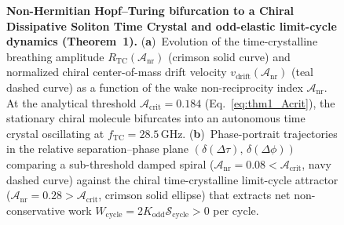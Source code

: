 \documentclass[11pt,letterpaper]{article}
\begin{document}
\begin{figure}[t!]
\centering
\resizebox{0.98\textwidth}{!}{}
\caption{\textbf{Non-Hermitian Hopf--Turing bifurcation to a Chiral Dissipative Soliton Time Crystal and odd-elastic limit-cycle dynamics (Theorem~1).} (\textbf{a})~Evolution of the time-crystalline breathing amplitude $R_{\mathrm{TC}}(\mathcal{A}_{\mathrm{nr}})$ (crimson solid curve) and normalized chiral center-of-mass drift velocity $v_{\mathrm{drift}}(\mathcal{A}_{\mathrm{nr}})$ (teal dashed curve) as a function of the wake non-reciprocity index $\mathcal{A}_{\mathrm{nr}}$. At the analytical threshold $\mathcal{A}_{\mathrm{crit}} = 0.184$ (Eq.~\eqref{eq:thm1_Acrit}), the stationary chiral molecule bifurcates into an autonomous time crystal oscillating at $f_{\mathrm{TC}} = 28.5\,\mathrm{GHz}$. (\textbf{b})~Phase-portrait trajectories in the relative separation--phase plane $(\delta(\Delta\tau),\,\delta(\Delta\phi))$ comparing a sub-threshold damped spiral ($\mathcal{A}_{\mathrm{nr}} = 0.08 < \mathcal{A}_{\mathrm{crit}}$, navy dashed curve) against the chiral time-crystalline limit-cycle attractor ($\mathcal{A}_{\mathrm{nr}} = 0.28 > \mathcal{A}_{\mathrm{crit}}$, crimson solid ellipse) that extracts net non-conservative work $W_{\mathrm{cycle}} = 2 K_{\mathrm{odd}}\mathcal{S}_{\mathrm{cycle}} > 0$ per cycle.}
\label{fig:thm1_bifurcation}
\end{figure}
\end{document}
